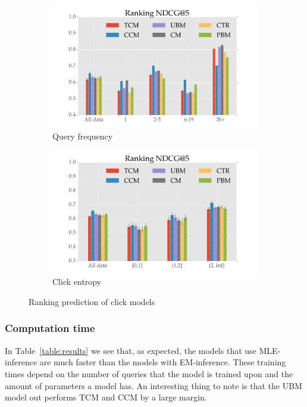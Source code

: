 \begin{figure}
	\centering
	\begin{subfigure}[b]{.49\textwidth}
		\centering
		\includegraphics[width=\textwidth]{figures/Ranking_NDCG_qf.pdf}
		\caption{Query frequency}
		\label{fig:rank_qf}
	\end{subfigure}
	\begin{subfigure}[b]{.49\textwidth}
		\centering
		\includegraphics[width=\textwidth]{figures/Ranking_NDCG_ce.pdf}
		\caption{Click entropy}
		\label{fig:rank_ce}
	\end{subfigure}
	\caption{Ranking prediction of click models}
\end{figure}


\subsubsection{Computation time}
In Table~\ref{table:results} we see that, as expected, the models that use MLE-inference are much faster than the models with EM-inference. These training times depend on the number of queries that the model is trained upon and the amount of parameters a model has. An interesting thing to note is that the UBM model out performs TCM and CCM by a large margin.

